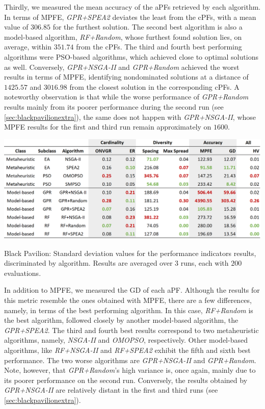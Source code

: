 Thirdly, we measured the mean accuracy of the \acp{aPF} retrieved by each algorithm. In terms of \ac{MPFE}, \textit{GPR+SPEA2} deviates the least from the \acp{cPF}, with a mean value of $306.85$ for the furthest solution. The second best algorithm is also a model-based algorithm, \textit{RF+Random}, whose furthest found solution lies, on average, within $351.74$ from the \acp{cPF}. The third and fourth best performing algorithms were \ac{PSO}-based algorithms, which achieved close to optimal solutions as well. Conversely, \textit{GPR+NSGA-II} and \textit{GPR+Random} achieved the worst results in terms of \ac{MPFE}, identifying nondominated solutions at a distance of $1425.57$ and $3016.98$ from the closest solution in the corresponding \acp{cPF}. A noteworthy observation is that while the worse performance of \textit{GPR+Random} results mainly from its poorer performance during the second run (see \cref{sec:blackpavilionextra}), the same does not happen with \textit{GPR+NSGA-II}, whose \ac{MPFE} results for the first and third run remain approximately on $1600$. 

\begin{table}[htbp]
	\centering
	\includegraphics[width=\textwidth]{Images/Evaluation/BlackPavilion/Results_Std_20190428.PNG}
	\caption[Black Pavilion: Standard deviation values for the performance indicators results, discriminated by algorithm]{Black Pavilion: Standard deviation values for the performance indicators results, discriminated by algorithm. Results are averaged over $3$ runs, each with $200$ evaluations.}
	\label{table:blackpavilionstd}
\end{table}

In addition to \ac{MPFE}, we measured the \ac{GD} of each \ac{aPF}. Although the results for this metric resemble the ones obtained with \ac{MPFE}, there are a few differences, namely, in terms of the best performing algorithm. In this case, \textit{RF+Random} is the best algorithm, followed closely by another model-based algorithm, the \textit{GPR+SPEA2}. The third and fourth best results correspond to two metaheuristic algorithms, namely, \textit{NSGA-II} and \textit{OMOPSO}, respectively. Other model-based algorithms, like \textit{RF+NSGA-II} and \textit{RF+SPEA2} exhibit the fifth and sixth best performance. The two worse algorithms are \textit{GPR+NSGA-II} and \textit{GPR+Random}. Note, however, that \textit{GPR+Random}'s high variance is, once again, mainly due to its poorer performance on the second run. Conversely, the results obtained by \textit{GPR+NSGA-II} are relatively distant in the first and third runs (see \cref{sec:blackpavilionextra}).


